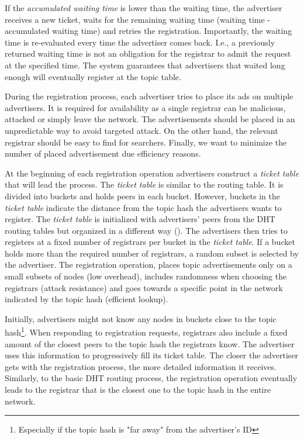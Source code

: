 If the \emph{accumulated waiting time} is lower than the waiting time, the advertiser receives a new ticket, waits for the remaining waiting time (waiting time - accumulated waiting time) and retries the registration. Importantly, the waiting time is re-evaluated every time the advertiser comes back. I.e., a previously returned waiting time is not an obligation for the registrar to admit the request at the specified time. The system guarantees that advertisers that waited long enough will eventually register at the topic table. 





During the registration process, each advertiser tries to place its ads on multiple advertisers. It is required for availability as a single registrar can be malicious, attacked or simply leave the network. The advertisements should be placed in an unpredictable way to avoid targeted attack. On the other hand, the relevant registrar should be easy to find for searchers. Finally, we want to minimize the number of placed advertisement due efficiency reasons. 

At the beginning of each registration operation advertisers construct a \emph{ticket table} that will lead the process. The \emph{ticket table} is similar to the routing table. It is divided into buckets and holds peers in each bucket. However, buckets in the \emph{ticket table} indicate the distance from the topic hash the advertisers wants to register. The \emph{ticket table} is initialized with advertisers' peers from the DHT routing tables but organized in a different way (). The advertisers then tries to registers at a fixed number of registrars per bucket in the \emph{ticket table}. If a bucket holds more than the required number of registrars, a random subset is selected by the advertiser. The registration operation, places topic advertisements only on a small subsets of nodes (low overhead), includes randomness when choosing the registrars (attack resistance) and goes towards a specific point in the network indicated by the topic hash (efficient lookup).

Initially, advertisers might not know any nodes in buckets close to the topic hash\footnote{Especially if the topic hash is "far away" from the advertiser's ID}. When responding to registration requests, registrars also include a fixed amount of the closest peers to the topic hash the registrars know. The advertiser uses this information to progressively fill its ticket table. The closer the advertiser gets with the registration process, the more detailed information it receives. Similarly, to the basic DHT routing process, the registration operation eventually leads to the registrar that is the closest one to the topic hash in the entire network. 

